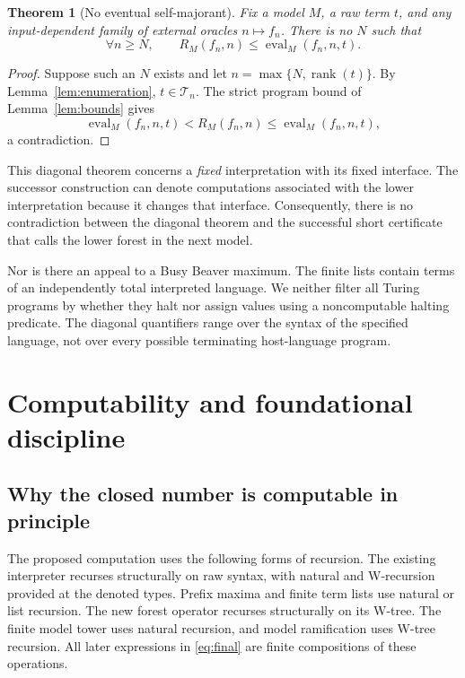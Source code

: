 \documentclass[11pt,letterpaper]{article}
\newtheorem{theorem}{Theorem}[section]
\theoremstyle{definition}
\newcommand{\Eval}{\operatorname{eval}}
\newcommand{\rank}{\operatorname{rank}}
\begin{document}
\begin{theorem}[No eventual self-majorant]\label{thm:diagonal}
Fix a model $M$, a raw term $t$, and any input-dependent family of external
oracles $n\mapsto f_n$. There is no $N$ such that
\[
 \forall n\ge N,\qquad R_M(f_n,n)\le\Eval_M(f_n,n,t).
\]
\end{theorem}
\begin{proof}
Suppose such an $N$ exists and let $n=\max\{N,\rank(t)\}$. By
Lemma~\ref{lem:enumeration}, $t\in\mathcal T_n$. The strict program bound of
Lemma~\ref{lem:bounds} gives
\[
 \Eval_M(f_n,n,t)<R_M(f_n,n)\le\Eval_M(f_n,n,t),
\]
a contradiction.
\end{proof}

This diagonal theorem concerns a \emph{fixed} interpretation with its fixed
interface. The successor construction can denote computations associated with
the lower interpretation because it changes that interface. Consequently,
there is no contradiction between the diagonal theorem and the successful
short certificate that calls the lower forest in the next model.

Nor is there an appeal to a Busy Beaver maximum. The finite lists contain
terms of an independently total interpreted language. We neither filter all
Turing programs by whether they halt nor assign values using a noncomputable
halting predicate. The diagonal quantifiers range over the syntax of the
specified language, not over every possible terminating host-language program.

\section{Computability and foundational discipline}
\label{sec:computability}

\subsection{Why the closed number is computable in principle}

The proposed computation uses the following forms of recursion. The existing
interpreter recurses structurally on raw syntax, with natural and W-recursion
provided at the denoted types. Prefix maxima and finite term lists use natural
or list recursion. The new forest operator recurses structurally on its
W-tree. The finite model tower uses natural recursion, and model ramification
uses W-tree recursion. All later expressions in \eqref{eq:final} are finite
compositions of these operations.
\end{document}
